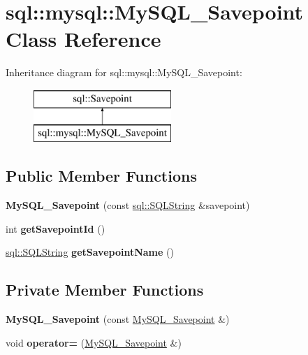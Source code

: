 \hypertarget{classsql_1_1mysql_1_1_my_s_q_l___savepoint}{}\section{sql\+:\+:mysql\+:\+:My\+S\+Q\+L\+\_\+\+Savepoint Class Reference}
\label{classsql_1_1mysql_1_1_my_s_q_l___savepoint}
Inheritance diagram for sql\+:\+:mysql\+:\+:My\+S\+Q\+L\+\_\+\+Savepoint\+:\begin{figure}[H]
\begin{center}
\leavevmode
\includegraphics[height=2.000000cm]{classsql_1_1mysql_1_1_my_s_q_l___savepoint}
\end{center}
\end{figure}
\subsection*{Public Member Functions}
\begin{DoxyCompactItemize}
\item 
\hypertarget{classsql_1_1mysql_1_1_my_s_q_l___savepoint_a864a5455837699c737623060010dd7b5}{}\label{classsql_1_1mysql_1_1_my_s_q_l___savepoint_a864a5455837699c737623060010dd7b5} 
{\bfseries My\+S\+Q\+L\+\_\+\+Savepoint} (const \hyperlink{classsql_1_1_s_q_l_string}{sql\+::\+S\+Q\+L\+String} \&savepoint)
\item 
\hypertarget{classsql_1_1mysql_1_1_my_s_q_l___savepoint_a0fb4031dfa691e3f2453c2d9eff5ea09}{}\label{classsql_1_1mysql_1_1_my_s_q_l___savepoint_a0fb4031dfa691e3f2453c2d9eff5ea09} 
int {\bfseries get\+Savepoint\+Id} ()
\item 
\hypertarget{classsql_1_1mysql_1_1_my_s_q_l___savepoint_a7c2aeca2f1c37da2ae0fe213eb9e6b40}{}\label{classsql_1_1mysql_1_1_my_s_q_l___savepoint_a7c2aeca2f1c37da2ae0fe213eb9e6b40} 
\hyperlink{classsql_1_1_s_q_l_string}{sql\+::\+S\+Q\+L\+String} {\bfseries get\+Savepoint\+Name} ()
\end{DoxyCompactItemize}
\subsection*{Private Member Functions}
\begin{DoxyCompactItemize}
\item 
\hypertarget{classsql_1_1mysql_1_1_my_s_q_l___savepoint_a5d22419f41050d85a471221aa2ab1e77}{}\label{classsql_1_1mysql_1_1_my_s_q_l___savepoint_a5d22419f41050d85a471221aa2ab1e77} 
{\bfseries My\+S\+Q\+L\+\_\+\+Savepoint} (const \hyperlink{classsql_1_1mysql_1_1_my_s_q_l___savepoint}{My\+S\+Q\+L\+\_\+\+Savepoint} \&)
\item 
\hypertarget{classsql_1_1mysql_1_1_my_s_q_l___savepoint_a5fe990219bc8761d47233c95867b52c4}{}\label{classsql_1_1mysql_1_1_my_s_q_l___savepoint_a5fe990219bc8761d47233c95867b52c4} 
void {\bfseries operator=} (\hyperlink{classsql_1_1mysql_1_1_my_s_q_l___savepoint}{My\+S\+Q\+L\+\_\+\+Savepoint} \&)
\end{DoxyCompactItemize}
